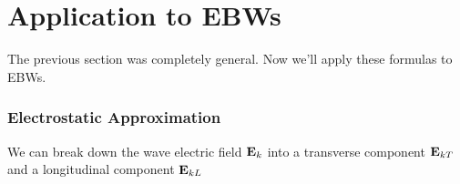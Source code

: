 \documentclass[12pt, twoside]{article}
\numberwithin{equation}{subsection}
\begin{document}
	
	
	
	
	\section{Application to EBWs}
	The previous section was completely general. Now we'll apply these formulas to EBWs.
	
	\subsubsection{Electrostatic Approximation}
	We can break down the wave electric field $\textbf{E}_k$ into a transverse component $\textbf{E}_{kT}$ and a longitudinal component $\textbf{E}_{kL}$
	
	
	
	\printbibliography
\end{document}
